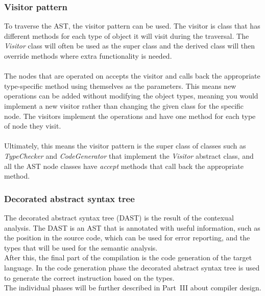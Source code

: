 \subsubsection{Visitor pattern}\label{comp:VisitorPattern}
To traverse the AST, the visitor pattern can be used. 
The visitor is class that has different methods for each type of object it will visit during the traversal. 
The \textit{Visitor} class will often be used as the super class and the derived class will then override methods where extra functionality is needed.
\\\\
The nodes that are operated on accepts the visitor and calls back the appropriate type-specific method using themselves as the parameters. 
This means new operations can be added without modifying the object types, meaning you would implement a new visitor rather than changing the given class for the specific node. 
The visitors implement the operations and have one method for each type of node they visit. 
\\\\
Ultimately, this means the visitor pattern is the super class of classes such as \textit{TypeChecker} and \textit{CodeGenerator} that implement the \textit{Visitor} abstract class, and all the AST node classes have \textit{accept} methods that call back the appropriate method.

\subsubsection{Decorated abstract syntax tree}
The decorated abstract syntax tree (DAST) is the result of the contexual analysis. The DAST is an AST that is annotated with useful information, such as the position in the source code, which can be used for error reporting, and the types that will be used for the semantic analysis.
\\
After this, the final part of the compilation is the code generation of the target language. In the code generation phase the decorated abstract syntax tree is used to generate the correct instruction based on the types. 
\\
The individual phases will be further described in Part~III  about compiler design.